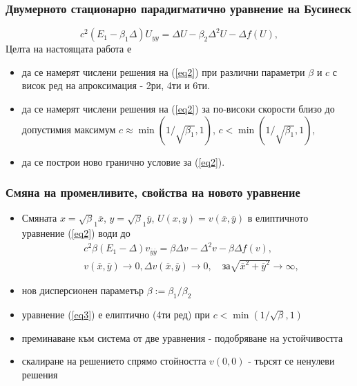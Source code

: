 \documentclass{beamer}
\newcommand{\rf}[1]{(\ref{#1})}
\begin{document}
\begin{frame}
\frametitle{ Двумерното стационарно парадигматично уравнение на Бусинеск }

\begin{equation}\label{eq2}
c^2 (E_1-\beta_1 \Delta) U_{yy} = \Delta U -\beta_2 \Delta^2 U - \Delta f(U),
\end{equation}
Целта на настоящата работа е
\begin{itemize}
  \item да се намерят числени решения на \rf{eq2} при различни параметри $\beta$ и $c$ с висок ред на апроксимация - 2ри, 4ти и 6ти.
  \item да се намерят числени решения на \rf{eq2} за по-високи скорости близо до допустимия максимум $c \approx \min (1/ \sqrt{\beta_1},1)$, $c < \min (1/ \sqrt{\beta_1},1)$,
  \item да се построи ново гранично условие за  \rf{eq2}.
\end{itemize}
\end{frame}

\begin{frame}
\frametitle{Смяна на променливите, свойства на новото уравнение } 
 
\begin{itemize}
\item Смяната $x=\sqrt\beta_1 { \overline x}$, $y=\sqrt\beta_1 { \overline y}$, $U(x,y)= v({ \overline x},{ \overline y} )$ в елиптичното уравнение \rf{eq2} води до
 \begin{align}\label{eq3}
&c^2 \beta (E_1- \Delta) v_{{\overline y}{\overline y}} = \beta \Delta v - \Delta^2 v - \beta \Delta f(v), \\ 
&v(\overline x, \overline y) \rightarrow 0,  \Delta v(\overline x, \overline y) \rightarrow 0 ,  \quad \text{за}  \sqrt{\overline x^2 + \overline y^2} \rightarrow \infty, \nonumber
\end{align}
\end{itemize}
\begin{itemize}
  \item нов дисперсионен параметър $\beta := \beta_1/\beta_2$
  \item уравнение \rf{eq3} е елиптично (4ти ред) при $c < \min (1/ \sqrt{\beta},1)$
  \item преминаване към система от две уравнения - подобряване на устойчивостта
  \item скалиране на решението спрямо стойността $v(0,0)$ - търсят се ненулеви решения 
\end{itemize}

\end{frame}
\end{document}
